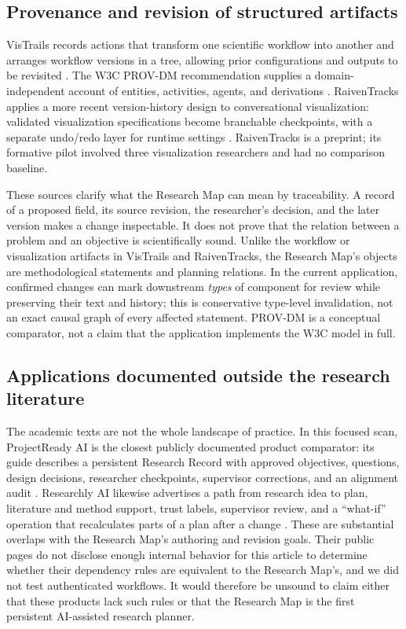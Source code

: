 \subsection{Provenance and revision of structured artifacts}

VisTrails records actions that transform one scientific workflow into another and arranges workflow versions in a tree, allowing prior configurations and outputs to be revisited \cite{freire2006vistrails}. The W3C PROV-DM recommendation supplies a domain-independent account of entities, activities, agents, and derivations \cite{moreau2013prov}. RaivenTracks applies a more recent version-history design to conversational visualization: validated visualization specifications become branchable checkpoints, with a separate undo/redo layer for runtime settings \cite{hugie2026raiventracks}. RaivenTracks is a preprint; its formative pilot involved three visualization researchers and had no comparison baseline.

These sources clarify what the Research Map can mean by traceability. A record of a proposed field, its source revision, the researcher's decision, and the later version makes a change inspectable. It does not prove that the relation between a problem and an objective is scientifically sound. Unlike the workflow or visualization artifacts in VisTrails and RaivenTracks, the Research Map's objects are methodological statements and planning relations. In the current application, confirmed changes can mark downstream \emph{types} of component for review while preserving their text and history; this is conservative type-level invalidation, not an exact causal graph of every affected statement. PROV-DM is a conceptual comparator, not a claim that the application implements the W3C model in full.

\subsection{Applications documented outside the research literature}

The academic texts are not the whole landscape of practice. In this focused scan, ProjectReady AI is the closest publicly documented product comparator: its guide describes a persistent Research Record with approved objectives, questions, design decisions, researcher checkpoints, supervisor corrections, and an alignment audit \cite{projectready2026guide}. Researchly AI likewise advertises a path from research idea to plan, literature and method support, trust labels, supervisor review, and a ``what-if'' operation that recalculates parts of a plan after a change \cite{researchly2026site}. These are substantial overlaps with the Research Map's authoring and revision goals. Their public pages do not disclose enough internal behavior for this article to determine whether their dependency rules are equivalent to the Research Map's, and we did not test authenticated workflows. It would therefore be unsound to claim either that these products lack such rules or that the Research Map is the first persistent AI-assisted research planner.

